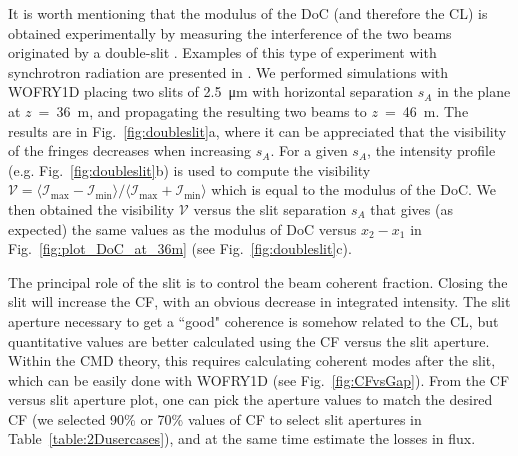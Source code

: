 \documentclass{iucr}
\newcommand{\inblue}[1]{{\color{blue}#1}}
\begin{document}
It is worth mentioning that the modulus of the DoC (and therefore the CL) is obtained experimentally by measuring the interference of the two beams originated by a double-slit \cite{ThompsonWolf1957}. Examples of this type of experiment with synchrotron radiation are presented in \cite{Chang2000, Paterson2001, Leitenberger2003, Tran2005}. We performed simulations with WOFRY1D placing two slits of \SI{2.5}{\micro\meter} with horizontal separation $s_A$ in the plane at $z$~=~\SI{36}{\meter}, and propagating the resulting two beams to $z$~=~\SI{46}{\meter}. The results are in \inblue{Fig.~\ref{fig:doubleslit}a}, where it can be appreciated that the visibility of the fringes decreases when increasing $s_A$. For a given $s_A$, the intensity profile (e.g. \inblue{Fig.~\ref{fig:doubleslit}b}) is used to compute the visibility $\mathcal{V}=\langle \mathcal{I}_{\text{max}}-\mathcal{I}_{\text{min}} \rangle\big/\langle \mathcal{I}_{\text{max}}+\mathcal{I}_{\text{min}}\rangle$ which is equal to the modulus of the DoC. We then obtained the visibility $\mathcal{V}$ versus the slit separation $s_A$ that gives (as expected) the same values as the modulus of DoC versus $x_2-x_1$ in \inblue{Fig.~\ref{fig:plot_DoC_at_36m}} (see \inblue{Fig.~\ref{fig:doubleslit}c}). 

The principal role of the slit is to control the beam coherent fraction. Closing the slit will increase the CF, with an obvious decrease in integrated intensity. The slit aperture necessary to get a ``good" coherence is somehow related to the CL, but quantitative values are better calculated using the CF versus the slit aperture. Within the CMD theory, this requires calculating coherent modes after the slit, which can be easily done with WOFRY1D (see \inblue{Fig.~\ref{fig:CFvsGap}}). From the CF versus slit aperture plot, one can pick the aperture values to match the desired CF (we selected 90\% or 70\% values of CF to select slit apertures in Table~\ref{table:2Dusercases}), and at the same time estimate the losses in flux.
\end{document}
